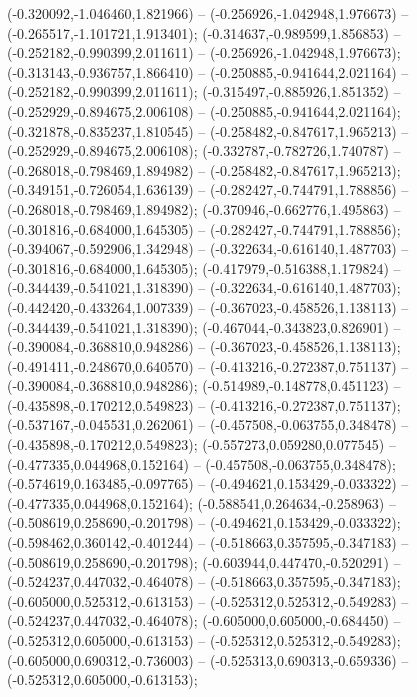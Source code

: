  (-0.320092,-1.046460,1.821966) -- (-0.256926,-1.042948,1.976673) -- (-0.265517,-1.101721,1.913401);
 (-0.314637,-0.989599,1.856853) -- (-0.252182,-0.990399,2.011611) -- (-0.256926,-1.042948,1.976673);
 (-0.313143,-0.936757,1.866410) -- (-0.250885,-0.941644,2.021164) -- (-0.252182,-0.990399,2.011611);
 (-0.315497,-0.885926,1.851352) -- (-0.252929,-0.894675,2.006108) -- (-0.250885,-0.941644,2.021164);
 (-0.321878,-0.835237,1.810545) -- (-0.258482,-0.847617,1.965213) -- (-0.252929,-0.894675,2.006108);
 (-0.332787,-0.782726,1.740787) -- (-0.268018,-0.798469,1.894982) -- (-0.258482,-0.847617,1.965213);
 (-0.349151,-0.726054,1.636139) -- (-0.282427,-0.744791,1.788856) -- (-0.268018,-0.798469,1.894982);
 (-0.370946,-0.662776,1.495863) -- (-0.301816,-0.684000,1.645305) -- (-0.282427,-0.744791,1.788856);
 (-0.394067,-0.592906,1.342948) -- (-0.322634,-0.616140,1.487703) -- (-0.301816,-0.684000,1.645305);
 (-0.417979,-0.516388,1.179824) -- (-0.344439,-0.541021,1.318390) -- (-0.322634,-0.616140,1.487703);
 (-0.442420,-0.433264,1.007339) -- (-0.367023,-0.458526,1.138113) -- (-0.344439,-0.541021,1.318390);
 (-0.467044,-0.343823,0.826901) -- (-0.390084,-0.368810,0.948286) -- (-0.367023,-0.458526,1.138113);
 (-0.491411,-0.248670,0.640570) -- (-0.413216,-0.272387,0.751137) -- (-0.390084,-0.368810,0.948286);
 (-0.514989,-0.148778,0.451123) -- (-0.435898,-0.170212,0.549823) -- (-0.413216,-0.272387,0.751137);
 (-0.537167,-0.045531,0.262061) -- (-0.457508,-0.063755,0.348478) -- (-0.435898,-0.170212,0.549823);
 (-0.557273,0.059280,0.077545) -- (-0.477335,0.044968,0.152164) -- (-0.457508,-0.063755,0.348478);
 (-0.574619,0.163485,-0.097765) -- (-0.494621,0.153429,-0.033322) -- (-0.477335,0.044968,0.152164);
 (-0.588541,0.264634,-0.258963) -- (-0.508619,0.258690,-0.201798) -- (-0.494621,0.153429,-0.033322);
 (-0.598462,0.360142,-0.401244) -- (-0.518663,0.357595,-0.347183) -- (-0.508619,0.258690,-0.201798);
 (-0.603944,0.447470,-0.520291) -- (-0.524237,0.447032,-0.464078) -- (-0.518663,0.357595,-0.347183);
 (-0.605000,0.525312,-0.613153) -- (-0.525312,0.525312,-0.549283) -- (-0.524237,0.447032,-0.464078);
 (-0.605000,0.605000,-0.684450) -- (-0.525312,0.605000,-0.613153) -- (-0.525312,0.525312,-0.549283);
 (-0.605000,0.690312,-0.736003) -- (-0.525313,0.690313,-0.659336) -- (-0.525312,0.605000,-0.613153);

